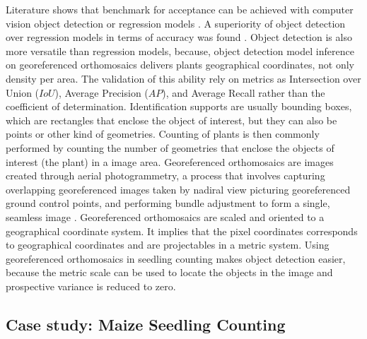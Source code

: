 \documentclass[journal,article,submit,pdftex,moreauthors]{Definitions/mdpi}
\begin{document}
Literature shows that benchmark for acceptance can be achieved with computer vision object detection
 \cite{liuIntegrateNetDeepLearning2022,davidPlantDetectionCounting2021,barretoAutomaticUAVbasedCounting2021}
or regression models \cite{liuEstimatingMaizeSeedling2022,EstimatesMaizePlant}.
A superiority of object detection over regression models in terms of accuracy was found
\cite{zouMaizeTasselsDetection2020}. Object detection is also more versatile than
regression models, because, object detection model inference on georeferenced orthomosaics delivers 
plants geographical coordinates, not only density per area.
The validation of this ability rely on metrics as Intersection over Union ($IoU$),
Average Precision ($AP$), and Average Recall \cite{linMicrosoftCOCOCommon2015} rather than
the coefficient of determination. 
Identification supports are usually bounding boxes, which are rectangles that enclose
the object of interest, but they can also be points or other kind of geometries.
Counting of plants is then commonly performed by counting the number of geometries 
that enclose the objects of interest (the plant) in a image area.
Georeferenced orthomosaics are images created through aerial photogrammetry, a process 
that involves capturing overlapping georeferenced images taken by nadiral view 
picturing georeferenced ground control points, and performing bundle adjustment to form 
a single, seamless image \cite{krausPhotogrammetryGeometryImages2011}.
Georeferenced orthomosaics are scaled and oriented to a geographical coordinate system.
It implies that the pixel coordinates corresponds to 
geographical coordinates and are projectables in a metric system.
Using georeferenced orthomosaics in seedling counting makes object detection 
easier, because the metric scale can be used to locate the objects 
in the image and prospective variance is reduced to zero.

\subsection{Case study: Maize Seedling Counting}
\end{document}
